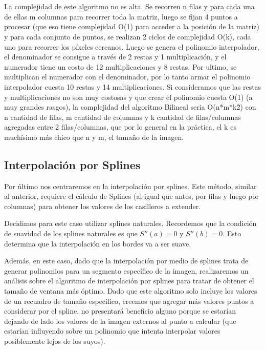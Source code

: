 \\
\\
La complejidad de este algoritmo no es alta. Se recorren n filas y para cada una de ellas m columnas para recorrer toda la matriz, luego se fijan 4 puntos a procesar (que eso tiene complejidad O(1) para acceder a la posición de la matriz) y para cada conjunto de puntos, se realizan 2 ciclos de complejidad O(k), cada uno para recorrer los píxeles cercanos. Luego se genera el polinomio interpolador, el denominador se consigue a través de 2 restas y 1 multiplicación, y el numerador tiene un costo de 12 multiplicaciones y 8 restas. Por ultimo, se multiplican el numerador con el denominador, por lo tanto armar el polinomio interpolador cuesta 10 restas y 14 multiplicaciones.
Si consideramos que las restas y multiplicaciones no son muy costosas y que crear el polinomio cuesta O(1) (a muy grandes rasgos), la complejidad del algoritmo Bilineal seria O(n*m*k\^{2}) con n cantidad de filas, m cantidad de columnas y k cantidad de filas/columnas agregadas entre 2 filas/columnas, que por lo general en la práctica, el k es muchísimo más chico que n y m, el tamaño de la imagen.


\subsection{Interpolación por Splines}
Por último nos centraremos en la interpolación por splines. Este método, similar al anterior, requiere el cálculo de Splines (al igual que antes, por filas y luego por columnas) para obtener los valores de los casilleros a extender.

Decidimos para este caso utilizar splines naturales. Recordemos que la condición de suavidad de los splines naturales es que $S''(a) = 0$ y $S''(b) = 0$. Esto determina que la interpolación en los bordes va a ser suave.

Además, en este caso, dado que la interpolación por medio de splines trata de generar polinomios para un segmento
específico de la imagen, realizaremos un análisis sobre el algoritmo de interpolación por splines para tratar de obtener el tamaño de ventana más óptimo. Dado que este algoritmo solo incluye los valores de un recuadro de tamaño específico, creemos que agregar más valores puntos a considerar por el spline, no presentará beneficio alguno porque se estarían dejando de lado los valores de la imagen externos al punto a calcular (que estarían influyendo sobre un polinomio que intenta interpolar valores posiblemente lejos de los suyos).

